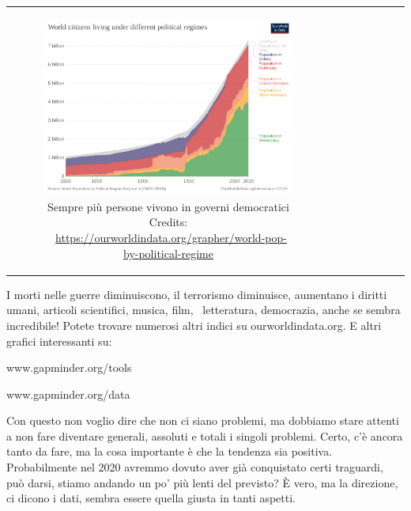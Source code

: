 \documentclass[12pt]{book} %
\begin{document}
\begin{table}[H]
\centering
\begin{tabular}{cc}
  \begin{subfigure}{0.5\textwidth}
    \centering
    \includegraphics[width=0.8\linewidth]{images/Libro-img012.png}
    \caption{Sempre più persone vivono in governi democratici
Credits: \ \protect\url{https://ourworldindata.org/grapher/world-pop-by-political-regime}}
  \end{subfigure}
  &
  \begin{subfigure}{0.5\textwidth}
    \centering
    \caption{}
  \end{subfigure}
  \\
\end{tabular}
\end{table}

\bigskip

I morti nelle guerre diminuiscono, il terrorismo diminuisce, aumentano i diritti umani, articoli scientifici, musica,
film, \ letteratura, democrazia, anche se sembra incredibile! Potete trovare numerosi altri indici su
ourworldindata.org. E altri grafici interessanti su:

www.gapminder.org/tools

www.gapminder.org/data


\bigskip

Con questo non voglio dire che non ci siano problemi, ma dobbiamo stare attenti a non fare diventare generali, assoluti
e totali i singoli problemi. Certo, c'è ancora tanto da fare, ma la cosa importante è che la
tendenza sia positiva. Probabilmente nel 2020 avremmo dovuto aver già conquistato certi traguardi, può darsi, stiamo
andando un po' più lenti del previsto? È vero, ma la direzione, ci dicono i dati, sembra essere quella giusta in tanti
aspetti.
\end{document}
